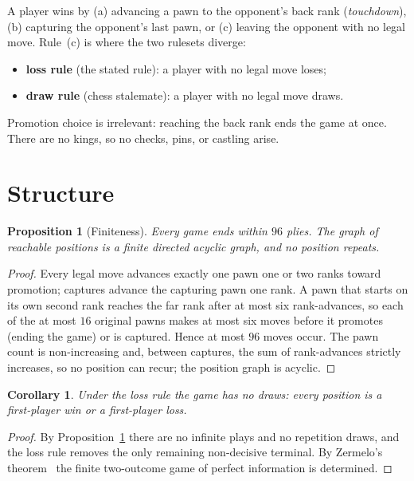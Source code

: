\documentclass[11pt]{article}
\theoremstyle{plain}
\newtheorem{proposition}{Proposition}
\newtheorem{corollary}{Corollary}
\theoremstyle{definition}
\begin{document}
A player wins by (a) advancing a pawn to the opponent's back rank
(\emph{touchdown}), (b) capturing the opponent's last pawn, or (c) leaving the
opponent with no legal move. Rule~(c) is where the two rulesets diverge:

\begin{itemize}
  \item \textbf{loss rule} (the stated rule): a player with no legal move loses;
  \item \textbf{draw rule} (chess stalemate): a player with no legal move draws.
\end{itemize}

Promotion choice is irrelevant: reaching the back rank ends the game at once.
There are no kings, so no checks, pins, or castling arise.

\section{Structure}\label{sec:structure}

\begin{proposition}[Finiteness]\label{prop:finite}
Every game ends within $96$ plies. The graph of reachable positions is a finite
directed acyclic graph, and no position repeats.
\end{proposition}

\begin{proof}
Every legal move advances exactly one pawn one or two ranks toward promotion;
captures advance the capturing pawn one rank. A pawn that starts on its own
second rank reaches the far rank after at most six rank-advances, so each of the
at most $16$ original pawns makes at most six moves before it promotes (ending the
game) or is captured. Hence at most $96$ moves occur. The pawn count is
non-increasing and, between captures, the sum of rank-advances strictly
increases, so no position can recur; the position graph is acyclic.
\end{proof}

\begin{corollary}\label{cor:nodraw}
Under the loss rule the game has no draws: every position is a first-player win
or a first-player loss.
\end{corollary}

\begin{proof}
By Proposition~\ref{prop:finite} there are no infinite plays and no repetition
draws, and the loss rule removes the only remaining non-decisive terminal. By
Zermelo's theorem~\cite{zermelo1913} the finite two-outcome game of perfect
information is determined.
\end{proof}
\end{document}
